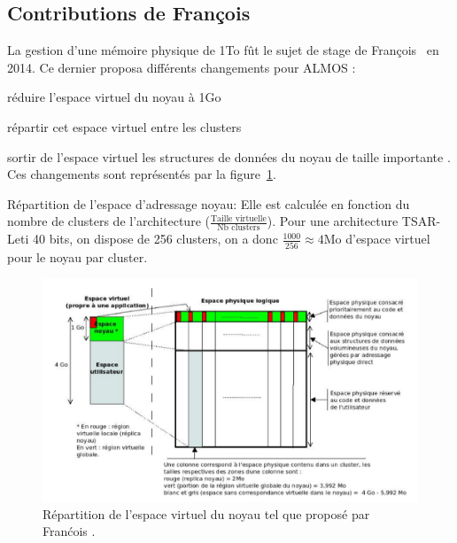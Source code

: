       
    \subsection{Contributions de François~\citeauthor{guerret2014exploitation}}
      
      La gestion d'une mémoire physique de 1To fût le sujet de stage de
      François~\citet{guerret2014exploitation} en 2014. Ce dernier proposa
      différents changements pour ALMOS : \benumline \item réduire l'espace
      virtuel du noyau à 1Go \item répartir cet espace virtuel entre les
      clusters \item sortir de l'espace virtuel les structures de données du
      noyau de taille importante \eenumline. Ces changements sont représentés
      par la figure~\ref{fig:almos-guerret}.

      \begin{paragraph}{Répartition de l'espace d'adressage noyau:}
        Elle est calculée en fonction du nombre de clusters de l'architecture
        ($\frac{\text{Taille virtuelle}}{\text{Nb clusters}}$). Pour une
        architecture TSAR-Leti 40 bits, on dispose de 256 clusters, on a donc
        $\frac{1000}{256}\approx4$Mo d'espace virtuel pour le noyau par cluster.
      \end{paragraph}

      \begin{figure}[ht]
        \centering \includegraphics[scale=0.8]{include/img/almos-guerret}
        \caption{Répartition de l'espace virtuel du noyau tel que proposé par
          Franćois \citet{guerret2014exploitation}.}
        \label{fig:almos-guerret}
      \end{figure}

